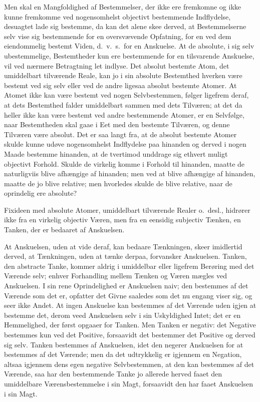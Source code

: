 \documentclass[12pt]{book}
\newcommand{\opage}[1]{\marginnote{\footnotesize\textit{[#1]}}}
\begin{document}
Men skal en Mangfoldighed af Bestemmelser, der ikke ere fremkomne og ikke kunne
fremkomme ved nogensomhelst objectivt bestemmende Indflydelse, desuagtet lade sig
bestemme, da kan det alene skee derved, at Bestemmelserne selv vise sig bestemmende
for en oversvævende Opfatning, for en ved dem eiendommelig bestemt Viden, d.\ v.\ s.\
for en Anskuelse. At de absolute, i sig selv ubestemmelige, Bestemtheder kun ere
bestemmende for en tilsvarende Anskuelse, vil ved nærmere Betragtning let indlyse. Det
absolut bestemte Atom, det umiddelbart tilværende Reale, kan jo i sin absolute
Bestemthed hverken være bestemt ved sig selv eller ved de andre ligesaa absolut
bestemte Atomer. At Atomet ikke kan være bestemt ved nogen Selvbestemmen, følger
ligefrem deraf, at dets Bestemthed falder umiddelbart sammen med dets Tilværen; at det
da heller ikke kan være bestemt ved andre bestemmende
\opage{14} Atomer, er en Selvfølge, naar Bestemtheden skal gaae i Eet med den bestemte Tilværen,
og denne Tilværen være absolut. Det er saa langt fra, at de absolut bestemte Atomer
skulde kunne udøve nogensomhelst Indflydelse paa hinanden og derved i nogen Maade
bestemme hinanden, at de tvertimod unddrage sig ethvert muligt objectivt Forhold.
Skulde de virkelig komme i Forhold til hinanden, maatte de naturligviis blive
afhængige af hinanden; men ved at blive afhængige af hinanden, maatte de jo blive
relative; men hvorledes skulde de blive relative, naar de oprindelig ere absolute?

Fixideen med absolute Atomer, umiddelbart tilværende Realer o.\ desl., hidrører ikke
fra en virkelig objectiv Væren, men fra en eensidig subjectiv Tænken, en Tanken, der
er bedaaret af Anskuelsen.

At Anskuelsen, uden at vide deraf, kan bedaare Tænkningen, skeer imidlertid derved, at
Tænkningen, uden at tænke derpaa, forvansker Anskuelsen. Tanken, den abstracte Tanke,
kommer aldrig i umiddelbar eller ligefrem Berøring med det Værende selv; enhver
Forhandling mellem Tænken og Væren mægles ved Anskuelsen. I sin rene Oprindelighed er
Anskuelsen naiv; den bestemmes af det Værende som det er, opfatter det Givne saaledes
som det nu engang viser sig, og seer ikke Andet. At ingen Anskuelse kan bestemmes af
det Værende uden igjen at bestemme det, derom veed Anskuelsen selv i sin Uskyldighed
Intet; det er en Hemmelighed, der først opgaaer for Tanken. Men Tanken er negativ: det
Negative bestemmes kun ved det Positive, forsaavidt det bestemmer det Positive og
derved sig selv. Tanken bestemmes af Anskuelsen, idet den negerer Anskuelsen for at
bestemmes af det Værende; men da det udtrykkelig er igjennem en Negation, altsaa
igjennem dens egen negative Selvbestemmen, at den kan bestemmes af det Værende, saa
har den bestemmende Tanke jo allerede herved faaet den umiddelbare Værensbestemmelse i
sin Magt, forsaavidt den har faaet Anskuelsen i sin Magt.
\end{document}
